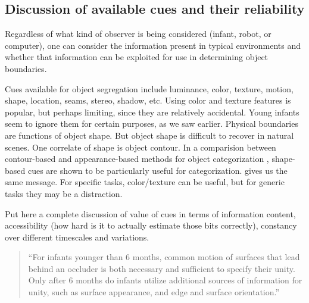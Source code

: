 \ifverbose

\subsection{Discussion of available cues and their reliability}

Regardless of what kind of observer is being considered (infant,
robot, or computer), one can consider the information present
in typical environments and whether that information can be
exploited for use in determining object boundaries.

Cues available for object segregation include luminance, color,
texture, motion, shape, location, seams, stereo, shadow, etc.
%
Using color and texture features is popular, but perhaps limiting, since they
are relatively accidental.  Young infants seem to ignore them for
certain purposes, as we saw earlier.
%
Physical boundaries are functions of object shape.  But object shape
is difficult to recover in natural scenes.
%
One correlate of shape is object contour.  In a comparision between
contour-based and appearance-based methods for object categorization
\cite{leibe03analyzing}, shape-based cues are shown to be
particularly useful for categorization.
 gives us the same message.
For specific tasks, color/texture can be useful, but for 
generic tasks they may be a distraction.

\fi


\ifverbose
Put here a complete discussion of value of cues in terms of
information content, accessibility (how hard is it to actually
estimate those bits correctly), constancy over different timescales
and variations.
\fi


\nocite{serre05object}
\nocite{swain91color}
\nocite{schiele00recognition}
\nocite{lowe04distinctive}
\nocite{felzenszwalb04efficient}
\nocite{quinn05learning}
\nocite{felzenszwalb04efficient}
\nocite{gibson88exploratory}
\nocite{spelke90principles}
\nocite{martin01database}
\nocite{madison01use}
\nocite{scharstein02taxonomy}
\nocite{feldman05information}
\nocite{mareschal02learning}
\nocite{wilcox99object}
\nocite{dannemiller87test}
\nocite{wilcox04priming}
\nocite{johnson96perception}
\nocite{needham05infants}
\nocite{johnson00infants}
\nocite{johnson03development}

\ifverbose
\begin{quote}

``For infants younger than 6 months, common motion of surfaces that lead
behind an occluder is both necessary and sufficient to specify their
unity. Only after 6 months do infants utilize additional sources of
information for unity, such as surface appearance, and edge and
surface orientation.'' \cite{mareschal02learning}

\end{quote}


